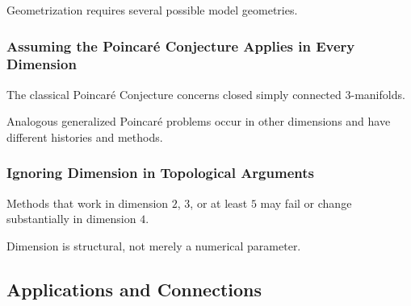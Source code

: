 Geometrization requires several possible model geometries.

\subsubsection{Assuming the Poincar\'e Conjecture Applies in Every Dimension}

The classical Poincar\'e Conjecture concerns closed simply connected
\(3\)-manifolds.

Analogous generalized Poincar\'e problems occur in other dimensions and
have different histories and methods.

\subsubsection{Ignoring Dimension in Topological Arguments}

Methods that work in dimension \(2\), \(3\), or at least \(5\) may fail or
change substantially in dimension \(4\).

Dimension is structural, not merely a numerical parameter.

\subsection{Applications and Connections}
\label{subsec:geometric-topology-applications}


